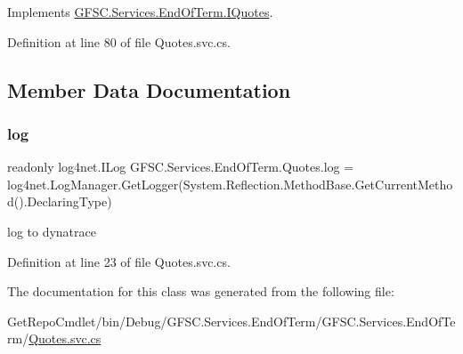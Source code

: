 Implements \mbox{\hyperlink{interface_g_f_s_c_1_1_services_1_1_end_of_term_1_1_i_quotes_a013eda014c2d0fef34e334f7c868d19c}{G\+F\+S\+C.\+Services.\+End\+Of\+Term.\+I\+Quotes}}.



Definition at line 80 of file Quotes.\+svc.\+cs.



\subsection{Member Data Documentation}
\mbox{\label{class_g_f_s_c_1_1_services_1_1_end_of_term_1_1_quotes_a92a57cf3cd2ba55b1af534b624502a66}} 
\subsubsection{\texorpdfstring{log}{log}}
{\footnotesize\ttfamily readonly log4net.\+I\+Log G\+F\+S\+C.\+Services.\+End\+Of\+Term.\+Quotes.\+log = log4net.\+Log\+Manager.\+Get\+Logger(System.\+Reflection.\+Method\+Base.\+Get\+Current\+Method().Declaring\+Type)\hspace{0.3cm}{\ttfamily [static]}}



log to dynatrace 



Definition at line 23 of file Quotes.\+svc.\+cs.



The documentation for this class was generated from the following file\+:\begin{DoxyCompactItemize}
\item 
Get\+Repo\+Cmdlet/bin/\+Debug/\+G\+F\+S\+C.\+Services.\+End\+Of\+Term/\+G\+F\+S\+C.\+Services.\+End\+Of\+Term/\mbox{\hyperlink{_quotes_8svc_8cs}{Quotes.\+svc.\+cs}}\end{DoxyCompactItemize}
